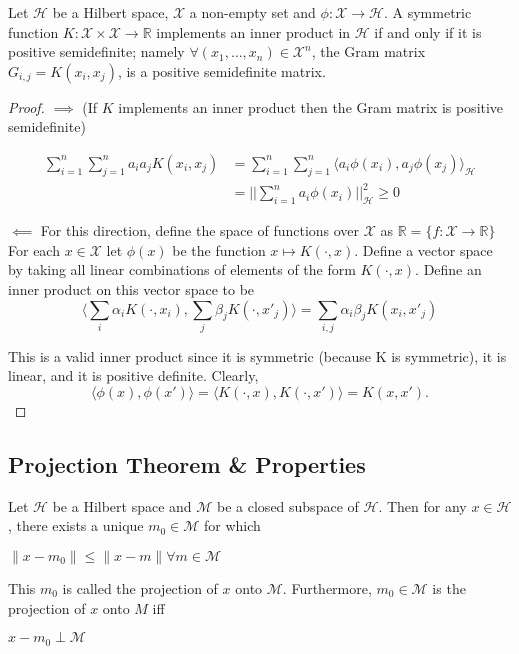 \documentclass[12pt]{article}
\begin{document}
\begin{lemma}
Let $\mathcal{H}$ be a Hilbert space, $\mathcal{X}$ a non-empty set and $\phi: \mathcal{X} \rightarrow \mathcal{H}$.
A symmetric function $K : \mathcal{X} \times \mathcal{X} \rightarrow \mathbb{R}$ implements an inner product
in $\mathcal{H}$ if and only if it is positive semidefinite; namely $\forall(x_{1},\dots,x_{n}) \in \mathcal{X}^{n}$, the Gram matrix
$G_{i,j} = K(x_{i},x_{j})$, is a positive semidefinite matrix. 
\end{lemma}
\begin{proof}
$\implies$ (If $K$ implements an inner product then the Gram matrix is positive semidefinite) 

\begin{align*}
\sum_{i = 1}^{n}\sum_{j = 1}^{n}a_{i} a_{j}K(x_{i},x_{j}) &= \sum_{i = 1}^{n}\sum_{j = 1}^{n} \langle a_{i} \phi(x_i), a_j \phi(x_j)\rangle_{\mathcal{H}} \\
 &= ||\sum_{i=1}^{n} a_{i} \phi(x_{i}) ||_{\mathcal{H}}^{2} \ge 0
\end{align*}

$\impliedby$
For this direction, define the space of functions over $\mathcal{X}$ as $\mathbb{R} = \{ f:\mathcal{X} \rightarrow  \mathbb{R}\}$
For each $x \in \mathcal{X}$ let $\phi(x)$ be the function $x \mapsto K(\cdot,x)$. Define a vector space by taking all
linear combinations of elements of the form $K(\cdot,x)$. Define an inner product on this vector space to be 
\[ \langle \sum_{i}\alpha_i K(\cdot,x_i), \sum_j \beta_j K(\cdot,x'_j) \rangle  = \sum_{i,j} \alpha_i \beta_j K(x_i,x'_j)\]  

This is a valid inner product since it is symmetric (because K is symmetric), it is linear, and it is positive definite.
Clearly,
\[\langle \phi(x), \phi(x')\rangle = \langle K(\cdot,x) ,K(\cdot,x') \rangle = K(x,x').\]
\end{proof}


\subsection{Projection Theorem \& Properties}
\begin{theorem}
Let $\mathcal{H}$ be a Hilbert space and $\mathcal{M}$ be a closed subspace of $\mathcal{H}$. Then for any $x\in\mathcal{H}$, there exists a unique $m_0\in\mathcal{M}$ for which
\begin{center}
    $\|x-m_0\|\leq \|x-m\| \forall m\in\mathcal{M}$
\end{center}
This $m_0$ is called the projection of $x$ onto $\mathcal{M}$. Furthermore, $m_0\in\mathcal{M}$ is the projection of $x$ onto $M$ iff
\begin{center}
    $x-m_0\perp \mathcal{M}$
\end{center}
\end{theorem}
\end{document}
